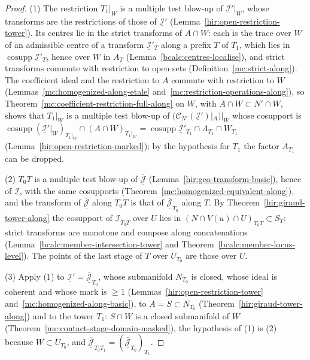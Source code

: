 \begin{proof}
\leanok
(1) The restriction \(T_1|_W\) is a multiple test blow-up of \(\underline{\mathcal I}'|_W\), whose transforms are the restrictions of those of \(\underline{\mathcal I}'\)
(Lemma~\ref{hir:open-restriction-tower}). Its centres lie in the strict transforms of \(A\cap W\): each is the trace over \(W\) of an admissible centre of a transform
\(\underline{\mathcal I}'_T\) along a prefix \(T\) of \(T_1\), which lies in \(\operatorname{cosupp}\underline{\mathcal I}'_T\), hence over \(W\) in \(A_T\)
(Lemma~\ref{bcalc:centres-localise}), and strict transforms commute with restriction to open sets (Definition~\ref{mc:strict-along}). The coefficient ideal and the
restriction to \(A\) commute with restriction to \(W\) (Lemmas~\ref{mc:homogenized-along-etale} and~\ref{mc:restriction-operations-along}), so
Theorem~\ref{mc:coefficient-restriction-full-along} on \(W\), with \(A\cap W\subset N'\cap W\), shows that \(T_1|_W\) is a multiple test blow-up of
\((\mathcal C_{N'}(\underline{\mathcal I}')|_A)|_W\) whose cosupport is \(\operatorname{cosupp}(\underline{\mathcal I}'|_W)_{T_1|_W}\cap(A\cap W)_{T_1|_W}
=\operatorname{cosupp}\underline{\mathcal I}'_{T_1}\cap A_{T_1}\cap W_{T_1}\) (Lemma~\ref{hir:open-restriction-marked}); by the hypothesis for \(T_1\) the factor \(A_{T_1}\) can be dropped.

(2) \(T_0T\) is a multiple test blow-up of \(\overline{\underline{\mathcal J}}\) (Lemma~\ref{hir:geo-transform-basic}), hence of \(\underline{\mathcal I}\), with the same cosupports
(Theorem~\ref{mc:homogenized-equivalent-along}), and the transform of \(\overline{\underline{\mathcal J}}\) along \(T_0T\) is that of \(\overline{\underline{\mathcal J}}_{T_0}\) along \(T\).
By Theorem~\ref{hir:giraud-tower-along} the cosupport of \(\underline{\mathcal I}_{T_0T}\) over \(U\) lies in \((N\cap V(u)\cap U)_{T_0T}\subset S_T\): strict transforms are monotone
and compose along concatenations (Lemma~\ref{bcalc:member-intersection-tower} and Theorem~\ref{bcalc:member-locus-level}). The points of the last stage of \(T\) over \(U_{T_0}\) are
those over \(U\).

(3) Apply (1) to \(\underline{\mathcal I}'=\overline{\underline{\mathcal J}}_{T_0}\), whose submanifold \(N_{T_0}\) is closed, whose ideal is coherent and whose mark is \(\ge1\)
(Lemmas~\ref{hir:open-restriction-tower} and~\ref{mc:homogenized-along-basic}), to \(A=S\subset N_{T_0}\) (Theorem~\ref{hir:giraud-tower-along}) and to the tower \(T_1\): \(S\cap W\) is a closed
submanifold of \(W\) (Theorem~\ref{mc:contact-stage-domain-masked}), the hypothesis of (1) is (2) because \(W\subset U_{T_0}\), and
\(\overline{\underline{\mathcal J}}_{T_0T_1}=(\overline{\underline{\mathcal J}}_{T_0})_{T_1}\).
\end{proof}
